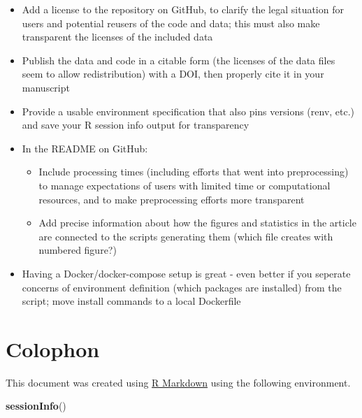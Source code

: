 \documentclass[
  a4paper,
]{article}
\newenvironment{Shaded}{\begin{snugshade}}{\end{snugshade}}
\newcommand{\FunctionTok}[1]{\textcolor[rgb]{0.13,0.29,0.53}{\textbf{#1}}}
\newcommand{\NormalTok}[1]{#1}
\providecommand{\tightlist}{%
  \setlength{\itemsep}{0pt}\setlength{\parskip}{0pt}}
\begin{document}
\begin{itemize}
\tightlist
\item
  Add a license to the repository on GitHub, to clarify the legal
  situation for users and potential reusers of the code and data; this
  must also make transparent the licenses of the included data
\item
  Publish the data and code in a citable form (the licenses of the data
  files seem to allow redistribution) with a DOI, then properly cite it
  in your manuscript
\item
  Provide a usable environment specification that also pins versions
  (renv, etc.) and save your R session info output for transparency
\item
  In the README on GitHub:

  \begin{itemize}
  \tightlist
  \item
    Include processing times (including efforts that went into
    preprocessing) to manage expectations of users with limited time or
    computational resources, and to make preprocessing efforts more
    transparent
  \item
    Add precise information about how the figures and statistics in the
    article are connected to the scripts generating them (which file
    creates with numbered figure?)
  \end{itemize}
\item
  Having a Docker/docker-compose setup is great - even better if you
  seperate concerns of environment definition (which packages are
  installed) from the script; move install commands to a local
  Dockerfile
\end{itemize}

\section{Colophon}\label{colophon}

This document was created using \href{https://rmarkdown.rstudio.com/}{R
Markdown} using the following environment.

\begin{Shaded}
\begin{Highlighting}[]
\FunctionTok{sessionInfo}\NormalTok{()}
\end{Highlighting}
\end{Shaded}
\end{document}
